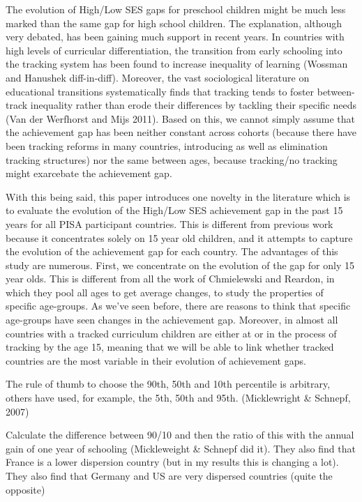 \documentclass[11pt, a4paper]{article}\usepackage[]{graphicx}\usepackage[]{color}
\begin{document}
The evolution of High/Low SES gaps for preschool children might be much less marked than the same gap for high school children. The explanation, although very debated, has been gaining much support in recent years. In countries with high levels of curricular differentiation, the transition from early schooling into the tracking system has been found to increase inequality of learning (Wossman and Hanushek diff-in-diff). Moreover, the vast sociological literature on educational transitions systematically finds that tracking tends to foster between-track inequality rather than erode their differences by tackling their specific needs (Van der Werfhorst and Mijs 2011). Based on this, we cannot simply assume that the achievement gap has been neither constant across cohorts (because there have been tracking reforms in many countries, introducing as well as elimination tracking structures) nor the same between ages, because tracking/no tracking might exarcebate the achievement gap.

With this being said, this paper introduces one novelty in the literature which is to evaluate the evolution of the High/Low SES achievement gap in the past 15 years for all PISA participant countries. This is different from previous work because it concentrates solely on 15 year old children, and it attempts to capture the evolution of the achievement gap for each country. The advantages of this study are numerous. First, we concentrate on the evolution of the gap for only 15 year olds. This is different from all the work of Chmielewski and Reardon, in which they pool all ages to get average changes, to study the properties of specific age-groups. As we've seen before, there are reasons to think that specific age-groups have seen changes in the achievement gap. Moreover, in almost all countries with a tracked curriculum children are either at or in the process of tracking by the age 15, meaning that we will be able to link whether tracked countries are the most variable in their evolution of achievement gaps.

The rule of thumb to choose the 90th, 50th and 10th percentile is arbitrary, others have used, for example, the 5th, 50th and 95th. (Micklewright \& Schnepf, 2007)

Calculate the difference between 90/10 and then the ratio of this with the annual gain of one year of schooling (Mickleweight \& Schnepf did it). They also find that France is a lower dispersion country (but in my results this is changing a lot). They also find that Germany and US are very dispersed countries (quite the opposite)
\end{document}
